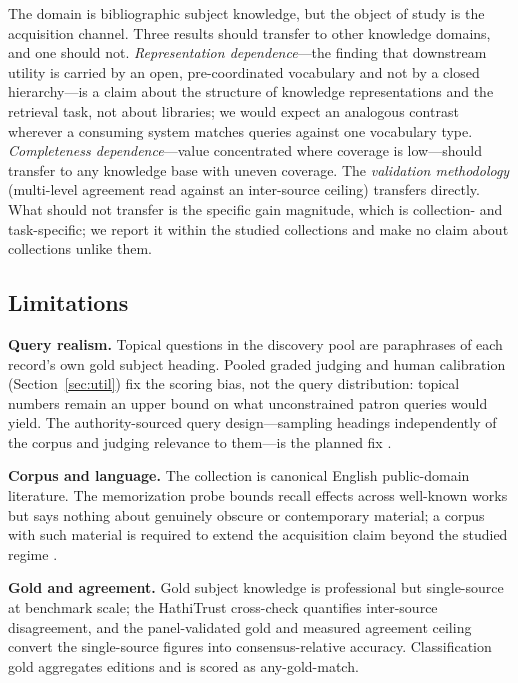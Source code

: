 The domain is bibliographic subject knowledge, but the object of study is
the acquisition channel. Three results should transfer to other knowledge
domains, and one should not. \emph{Representation dependence}---the finding
that downstream utility is carried by an open, pre-coordinated vocabulary
and not by a closed hierarchy---is a claim about the structure of
knowledge representations and the retrieval task, not about libraries;
we would expect an analogous contrast wherever a consuming system matches
queries against one vocabulary type. \emph{Completeness dependence}---value
concentrated where coverage is low---should transfer to any knowledge base
with uneven coverage. The \emph{validation methodology} (multi-level
agreement read against an inter-source ceiling) transfers directly. What
should not transfer is the specific gain magnitude, which is collection- and
task-specific; we report it within the studied collections and make no
claim about collections unlike them.

\subsection{Limitations}

\textbf{Query realism.} Topical questions in the discovery pool are
paraphrases of each record's own gold subject heading. Pooled graded
judging and human calibration (Section~\ref{sec:util}) fix the scoring
bias, not the query distribution: topical numbers remain an upper bound on
what unconstrained patron queries would yield. The authority-sourced query
design---sampling headings independently of the corpus and judging
relevance to them---is the planned fix .

\textbf{Corpus and language.} The collection is canonical English
public-domain literature. The memorization probe bounds recall effects
across well-known works but says nothing about genuinely obscure or
contemporary material; a corpus with such material is required to extend
the acquisition claim beyond the studied regime .

\textbf{Gold and agreement.} Gold subject knowledge is professional but
single-source at benchmark scale; the HathiTrust cross-check quantifies
inter-source disagreement, and the panel-validated gold and measured
agreement ceiling  convert the single-source figures into
consensus-relative accuracy. Classification gold aggregates editions and is
scored as any-gold-match.

